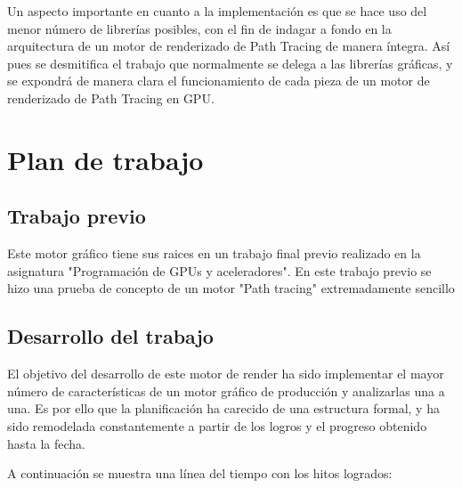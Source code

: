 Un aspecto importante en cuanto a la implementación es que se hace uso del menor número de librerías posibles, con el fin de indagar a fondo en la arquitectura de un motor de renderizado de Path Tracing de manera íntegra. Así pues se desmitifica el trabajo que normalmente se delega a las librerías gráficas, y se expondrá de manera clara el funcionamiento de cada pieza de un motor de renderizado de Path Tracing en GPU.


\section{Plan de trabajo}
	
\subsection{Trabajo previo}

Este motor gráfico tiene sus raices en un trabajo final previo realizado en la asignatura "Programación de GPUs y aceleradores". En este trabajo previo se hizo una prueba de concepto de un motor "Path tracing" extremadamente sencillo 
	
\subsection{Desarrollo del trabajo}
	
El objetivo del desarrollo de este motor de render ha sido implementar el mayor número de características de un motor gráfico de producción y analizarlas una a una. Es por ello que la planificación ha carecido de una estructura formal, y ha sido remodelada constantemente a partir de los logros y el progreso obtenido hasta la fecha.



A continuación se muestra una línea del tiempo con los hitos logrados:	


